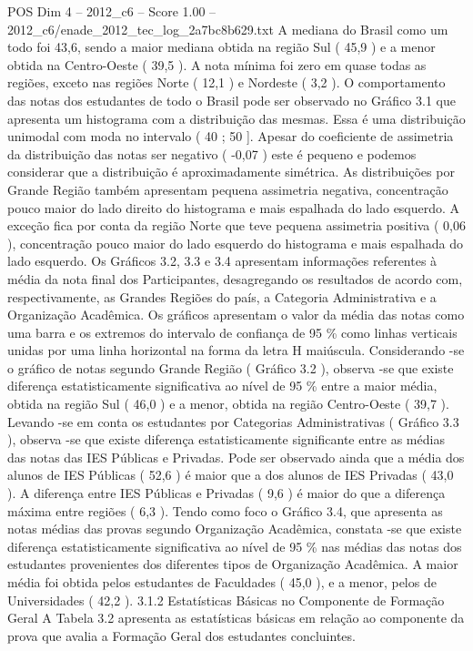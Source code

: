 \begin{textsample}{POS Dim 4 – 2012\_c6 – Score 1.00 – 2012\_c6/enade\_2012\_tec\_log\_2a7bc8b629.txt}
A mediana do Brasil como um todo foi 43,6, sendo a maior mediana obtida na região Sul ( 45,9 ) e a menor obtida na Centro-Oeste ( 39,5 ).
A nota mínima foi zero em quase todas as regiões, exceto nas regiões Norte ( 12,1 ) e Nordeste ( 3,2 ).
O comportamento das notas dos estudantes de todo o Brasil pode ser observado no Gráfico 3.1 que apresenta um histograma com a distribuição das mesmas.
Essa é uma distribuição unimodal com moda no intervalo ( 40 ; 50 ].
Apesar do coeficiente de assimetria da distribuição das notas ser negativo ( -0,07 ) este é pequeno e podemos considerar que a distribuição é aproximadamente simétrica.
As distribuições por Grande Região também apresentam pequena assimetria negativa, concentração pouco maior do lado direito do histograma e mais espalhada do lado esquerdo.
A exceção fica por conta da região Norte que teve pequena assimetria positiva ( 0,06 ), concentração pouco maior do lado esquerdo do histograma e mais espalhada do lado esquerdo.
Os Gráficos 3.2, 3.3 e 3.4 apresentam informações referentes à média da nota final dos Participantes, desagregando os resultados de acordo com, respectivamente, as Grandes Regiões do país, a Categoria Administrativa e a Organização Acadêmica.
Os gráficos apresentam o valor da média das notas como uma barra e os extremos do intervalo de confiança de 95 \% como linhas verticais unidas por uma linha horizontal na forma da letra H maiúscula.
Considerando -se o gráfico de notas segundo Grande Região ( Gráfico 3.2 ), observa -se que existe diferença estatisticamente significativa ao nível de 95 \% entre a maior média, obtida na região Sul ( 46,0 ) e a menor, obtida na região Centro-Oeste ( 39,7 ).
Levando -se em conta os estudantes por Categorias Administrativas ( Gráfico 3.3 ), observa -se que existe diferença estatisticamente significante entre as médias das notas das IES Públicas e Privadas.
Pode ser observado ainda que a média dos alunos de IES Públicas ( 52,6 ) é maior que a dos alunos de IES Privadas ( 43,0 ).
A diferença entre IES Públicas e Privadas ( 9,6 ) é maior do que a diferença máxima entre regiões ( 6,3 ).
Tendo como foco o Gráfico 3.4, que apresenta as notas médias das provas segundo Organização Acadêmica, constata -se que existe diferença estatisticamente significativa ao nível de 95 \% nas médias das notas dos estudantes provenientes dos diferentes tipos de Organização Acadêmica.
A maior média foi obtida pelos estudantes de Faculdades ( 45,0 ), e a menor, pelos de Universidades ( 42,2 ). 3.1.2 Estatísticas Básicas no Componente de Formação Geral A Tabela 3.2 apresenta as estatísticas básicas em relação ao componente da prova que avalia a Formação Geral dos estudantes concluintes.

\end{textsample}
